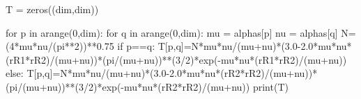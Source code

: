 \documentclass[
  letterpaper,
  DIV=11,
  numbers=noendperiod]{scrreprt}
\newenvironment{Shaded}{\begin{snugshade}}{\end{snugshade}}
\newcommand{\BuiltInTok}[1]{\textcolor[rgb]{0.00,0.23,0.31}{#1}}
\newcommand{\ControlFlowTok}[1]{\textcolor[rgb]{0.00,0.23,0.31}{#1}}
\newcommand{\DecValTok}[1]{\textcolor[rgb]{0.68,0.00,0.00}{#1}}
\newcommand{\FloatTok}[1]{\textcolor[rgb]{0.68,0.00,0.00}{#1}}
\newcommand{\KeywordTok}[1]{\textcolor[rgb]{0.00,0.23,0.31}{#1}}
\newcommand{\NormalTok}[1]{\textcolor[rgb]{0.00,0.23,0.31}{#1}}
\newcommand{\OperatorTok}[1]{\textcolor[rgb]{0.37,0.37,0.37}{#1}}
\begin{document}
\begin{Shaded}
\begin{Highlighting}[]
\NormalTok{T }\OperatorTok{=}\NormalTok{ zeros((dim,dim))}

\ControlFlowTok{for}\NormalTok{ p }\KeywordTok{in}\NormalTok{ arange(}\DecValTok{0}\NormalTok{,dim):}
    \ControlFlowTok{for}\NormalTok{ q }\KeywordTok{in}\NormalTok{ arange(}\DecValTok{0}\NormalTok{,dim):}
\NormalTok{        mu }\OperatorTok{=}\NormalTok{ alphas[p]}
\NormalTok{        nu }\OperatorTok{=}\NormalTok{ alphas[q]}
\NormalTok{        N}\OperatorTok{=}\NormalTok{(}\DecValTok{4}\OperatorTok{*}\NormalTok{mu}\OperatorTok{*}\NormalTok{nu}\OperatorTok{/}\NormalTok{(pi}\OperatorTok{**}\DecValTok{2}\NormalTok{))}\OperatorTok{**}\FloatTok{0.75}
        \ControlFlowTok{if}\NormalTok{ p}\OperatorTok{==}\NormalTok{q:}
\NormalTok{            T[p,q]}\OperatorTok{=}\NormalTok{N}\OperatorTok{*}\NormalTok{mu}\OperatorTok{*}\NormalTok{nu}\OperatorTok{/}\NormalTok{(mu}\OperatorTok{+}\NormalTok{nu)}\OperatorTok{*}\NormalTok{(}\FloatTok{3.0}\OperatorTok{{-}}\FloatTok{2.0}\OperatorTok{*}\NormalTok{mu}\OperatorTok{*}\NormalTok{nu}\OperatorTok{*}\NormalTok{(rR1}\OperatorTok{*}\NormalTok{rR2)}\OperatorTok{/}\NormalTok{(mu}\OperatorTok{+}\NormalTok{nu))}\OperatorTok{*}\NormalTok{(pi}\OperatorTok{/}\NormalTok{(mu}\OperatorTok{+}\NormalTok{nu))}\OperatorTok{**}\NormalTok{(}\DecValTok{3}\OperatorTok{/}\DecValTok{2}\NormalTok{)}\OperatorTok{*}\NormalTok{exp(}\OperatorTok{{-}}\NormalTok{mu}\OperatorTok{*}\NormalTok{nu}\OperatorTok{*}\NormalTok{(rR1}\OperatorTok{*}\NormalTok{rR2)}\OperatorTok{/}\NormalTok{(mu}\OperatorTok{+}\NormalTok{nu))}
        \ControlFlowTok{else}\NormalTok{:}
\NormalTok{            T[p,q]}\OperatorTok{=}\NormalTok{N}\OperatorTok{*}\NormalTok{mu}\OperatorTok{*}\NormalTok{nu}\OperatorTok{/}\NormalTok{(mu}\OperatorTok{+}\NormalTok{nu)}\OperatorTok{*}\NormalTok{(}\FloatTok{3.0}\OperatorTok{{-}}\FloatTok{2.0}\OperatorTok{*}\NormalTok{mu}\OperatorTok{*}\NormalTok{nu}\OperatorTok{*}\NormalTok{(rR2}\OperatorTok{*}\NormalTok{rR2)}\OperatorTok{/}\NormalTok{(mu}\OperatorTok{+}\NormalTok{nu))}\OperatorTok{*}\NormalTok{(pi}\OperatorTok{/}\NormalTok{(mu}\OperatorTok{+}\NormalTok{nu))}\OperatorTok{**}\NormalTok{(}\DecValTok{3}\OperatorTok{/}\DecValTok{2}\NormalTok{)}\OperatorTok{*}\NormalTok{exp(}\OperatorTok{{-}}\NormalTok{mu}\OperatorTok{*}\NormalTok{nu}\OperatorTok{*}\NormalTok{(rR2}\OperatorTok{*}\NormalTok{rR2)}\OperatorTok{/}\NormalTok{(mu}\OperatorTok{+}\NormalTok{nu))}
\BuiltInTok{print}\NormalTok{(T)}
\end{Highlighting}
\end{Shaded}
\end{document}
